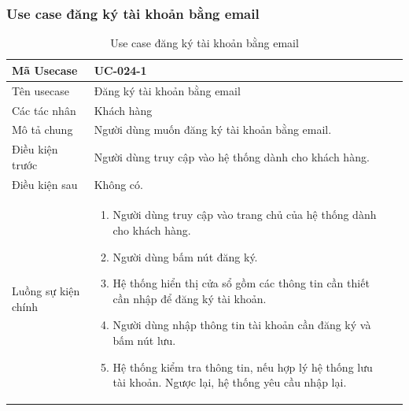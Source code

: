 \documentclass[12pt,a4paper]{article}
\begin{document}
    \subsubsection*{Use case đăng ký tài khoản bằng email}
    \begin{table}[H]
        \centering
        \begin{tabular}{|p{3.5cm}|p{11.5cm}|c|}
            \hline
            Mã Usecase      & UC-024-1                                              \\
            \hline
            Tên usecase     & Đăng ký tài khoản bằng email                          \\
            \hline
            Các tác nhân    & Khách hàng                                            \\
            \hline
            Mô tả chung     & Người dùng muốn đăng ký tài khoản bằng email.         \\
            \hline

            Điều kiện trước & Người dùng truy cập vào hệ thống dành cho khách hàng. \\
            \hline

            Điều kiện sau   & Không có.                                             \\
            \hline

            Luồng sự kiện chính & \vspace{-.8cm}\begin{enumerate}
                                                    \item Người dùng truy cập vào trang chủ của hệ thống dành cho khách hàng.
                                                    \item Người dùng bấm nút đăng ký.
                                                    \item Hệ thống hiển thị cửa sổ gồm các thông tin cần thiết cần nhập để đăng ký tài khoản.
                                                    \item Người dùng nhập thông tin tài khoản cần đăng ký và bấm nút lưu.
                                                    \item Hệ thống kiểm tra thông tin, nếu hợp lý hệ thống lưu tài khoản. Ngược lại, hệ thống yêu cầu nhập lại.
            \end{enumerate}
            \\
            \hline
        \end{tabular}
        \caption{Use case đăng ký tài khoản bằng email}

    \end{table}
\end{document}
